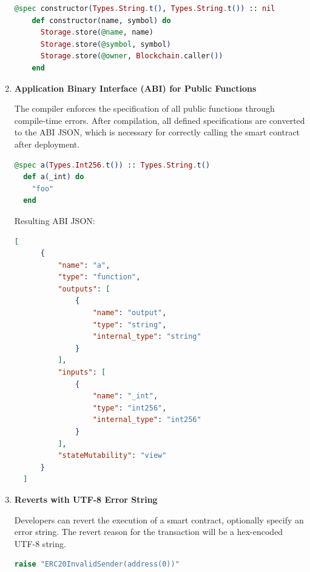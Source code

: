 \begin{enumerate}
  \begin{lstlisting}[caption={Constructor}, language=elixir, label={lst:calldata_decoding_recursive}]
    @spec constructor(Types.String.t(), Types.String.t()) :: nil
    def constructor(name, symbol) do
      Storage.store(@name, name)
      Storage.store(@symbol, symbol)
      Storage.store(@owner, Blockchain.caller())
    end
  \end{lstlisting}
  
  \item \textbf{Application Binary Interface (ABI) for Public Functions}
  
  The compiler enforces the specification of all public functions through compile-time errors. After compilation, all defined specifications are converted to the ABI JSON, which is necessary for correctly calling the smart contract after deployment.

  \begin{lstlisting}[caption={@spec}, language=elixir, label={lst:calldata_decoding_recursive}]
  @spec a(Types.Int256.t()) :: Types.String.t()
  def a(_int) do
    "foo"
  end
  \end{lstlisting}
  
  Resulting ABI JSON:
  \begin{lstlisting}[caption={ABI }, language=json, label={lst:calldata_decoding_recursive}]
    [
      {
          "name": "a",
          "type": "function",
          "outputs": [
              {
                  "name": "output",
                  "type": "string",
                  "internal_type": "string"
              }
          ],
          "inputs": [
              {
                  "name": "_int",
                  "type": "int256",
                  "internal_type": "int256"
              }
          ],
          "stateMutability": "view"
      }
  ]
  \end{lstlisting}
  
  \item \textbf{Reverts with UTF-8 Error String}

  Developers can revert the execution of a smart contract, optionally specify an error string. The revert reason for the transaction will be a hex-encoded UTF-8 string.

  \begin{lstlisting}[caption={Reverts}, language=elixir, label={lst:calldata_decoding_recursive}]
    raise "ERC20InvalidSender(address(0))"
  \end{lstlisting}
\end{enumerate}

